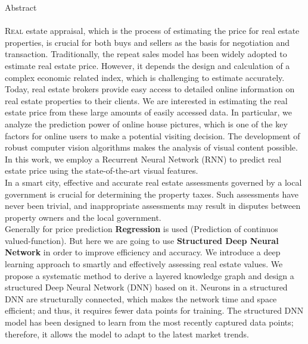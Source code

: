 \documentclass[11pt,fleqn]{book} %
\begin{document}
\newpage
\bfseries \fontsize{15}{19} \normalfont \centerline{\LARGE\color{ocre} Abstract} 
			          \pagestyle{empty}
			         {\setlength{\baselineskip}{2\baselineskip}
			         
\paragraph*{}\lettrine[lines=2]{\color{ocre!60} R}{eal} estate appraisal, which is the process of estimating the price for real estate properties, is crucial for both buys and sellers as the basis for negotiation and transaction. Traditionally, the repeat sales model has been widely adopted to estimate real estate price. However, it depends the design and calculation of a complex economic related index, which is challenging to estimate accurately. Today, real estate brokers provide easy access to detailed online information on real estate properties to their clients. We are interested in estimating the real estate price from these large amounts of easily accessed data. In particular, we analyze the prediction power of online house pictures, which is one of the key factors for online users to make a potential visiting decision. The development of robust computer vision algorithms makes the analysis of visual content possible. In this work, we employ a Recurrent Neural Network (RNN) to predict real estate price using the state-of-the-art visual features.\\
In a smart city, effective and accurate real estate assessments governed by a local government is crucial for determining the property taxes. Such assessments have never been trivial, and inappropriate assessments may result in disputes between property owners and the local government.\\
Generally for price prediction \textbf{\color{ocre} Regression} is used (Prediction of continuos valued-function). But here we are going to use \textbf{\color{ocre} Structured Deep Neural Network} in order to improve efficiency and accuracy. We introduce a deep learning approach to smartly and effectively assessing real estate values. We propose a systematic method to derive a layered knowledge graph and design a structured Deep Neural Network (DNN) based on it. Neurons in a structured DNN are structurally connected, which makes the network time and space efficient; and thus, it requires fewer data points for training. The structured DNN model has been designed to learn from the most recently captured data points; therefore, it allows the model to adapt to the latest market trends.

			         }
\end{document}

